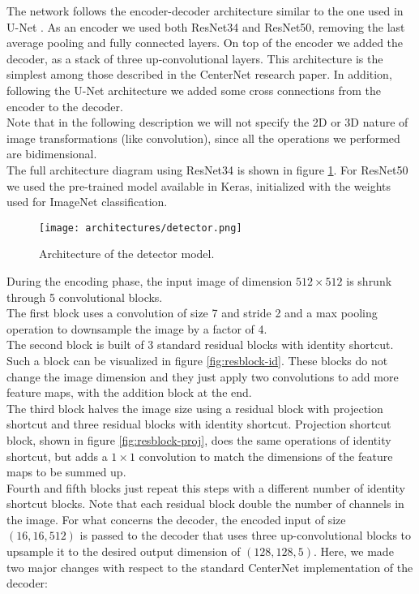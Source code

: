 The network follows the encoder-decoder architecture similar to the one used in U-Net \cite{Ronneberger2015-tf}. As an encoder we used both ResNet34 \cite{deep-residual} and ResNet50, removing the last average pooling and fully connected layers. On top of the encoder we added the decoder, as a stack of three up-convolutional layers. This architecture is the simplest among those described in the CenterNet research paper. In addition, following the U-Net architecture we added some cross connections from the encoder to the decoder.\\
Note that in the following description we will not specify the 2D or 3D nature of image transformations (like convolution), since all the operations we performed are bidimensional.\\
The full architecture diagram using ResNet34 is shown in figure \ref{fig:detector}. For ResNet50 we used the pre-trained model available in Keras, initialized with the weights used for ImageNet classification.\\

\begin{figure}[h]
	\caption{Architecture of the detector model.}
	\centering
	\texttt{[image: architectures/detector.png]}
	\label{fig:detector}
\end{figure}

\noindent During the encoding phase, the input image of dimension $512 \times 512$ is shrunk through 5 convolutional blocks.\\
The first block uses a convolution of size 7 and stride 2 and a max pooling operation to downsample the image by a factor of 4.\\
The second block is built of 3 standard residual blocks with identity shortcut. Such a block can be visualized in figure \ref{fig:resblock-id}. These blocks do not change the image dimension and they just apply two convolutions to add more feature maps, with the addition block at the end.\\
The third block halves the image size using a residual block with projection shortcut and three residual blocks with identity shortcut. Projection shortcut block, shown in figure \ref{fig:resblock-proj}, does the same operations of identity shortcut, but adds a $1\times 1$ convolution to match the dimensions of the feature maps to be summed up.\\
Fourth and fifth blocks just repeat this steps with a different number of identity shortcut blocks. Note that each residual block double the number of channels in the image. For what concerns the decoder, the encoded input of size $(16, 16, 512)$ is passed to the decoder that uses three up-convolutional blocks to upsample it to the desired output dimension of $(128, 128, 5)$. Here, we made two major changes with respect to the standard CenterNet implementation of the decoder:

